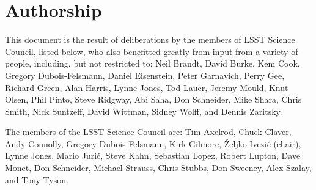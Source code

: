 \section{Authorship}

This document is the result of deliberations by the members of
LSST Science Council, listed below, who also benefitted greatly from
input from a variety of people, including, but not restricted to:
Neil Brandt, David Burke, Kem Cook, Gregory Dubois-Felsmann, Daniel Eisenstein,
Peter Garnavich, Perry Gee, Richard Green, Alan Harris, Lynne Jones,
Tod Lauer, Jeremy Mould, Knut Olsen, Phil Pinto,
Steve Ridgway, Abi Saha, Don Schneider, Mike Shara, Chris Smith, Nick
Suntzeff, David Wittman, Sidney Wolff, and Dennis Zaritsky.

The members of the LSST Science Council are:
 Tim Axelrod,
 Chuck Claver,
 Andy Connolly,
 Gregory Dubois-Felsmann,
 Kirk Gilmore,
 \v{Z}eljko Ivezi\'{c} (chair),
 Lynne Jones,
 Mario Juri\'{c},
 Steve Kahn,
 Sebastian Lopez,
 Robert Lupton,
 Dave Monet,
 Don Schneider,
 Michael Strauss,
 Chris Stubbs,
 Don Sweeney,
 Alex Szalay, and
 Tony Tyson.

